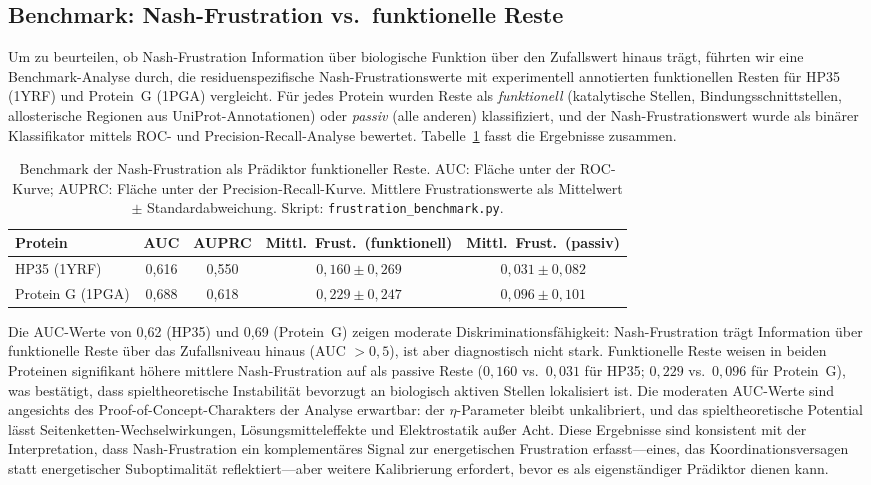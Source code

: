 \documentclass[12pt,a4paper]{article}
\theoremstyle{remark}
\begin{document}
\subsection{Benchmark: Nash-Frustration vs.\ funktionelle Reste}
\label{sec:frustration-benchmark}

Um zu beurteilen, ob Nash-Frustration Information \"uber biologische Funktion \"uber den Zufallswert hinaus tr\"agt, f\"uhrten wir eine Benchmark-Analyse durch, die residuenspezifische Nash-Frustrationswerte mit experimentell annotierten funktionellen Resten f\"ur HP35 (1YRF) und Protein~G (1PGA) vergleicht. F\"ur jedes Protein wurden Reste als \emph{funktionell} (katalytische Stellen, Bindungsschnittstellen, allosterische Regionen aus UniProt-Annotationen) oder \emph{passiv} (alle anderen) klassifiziert, und der Nash-Frustrationswert wurde als bin\"arer Klassifikator mittels ROC- und Precision-Recall-Analyse bewertet. Tabelle~\ref{tab:frustration-benchmark} fasst die Ergebnisse zusammen.

\begin{table}[ht]
\centering
\caption{Benchmark der Nash-Frustration als Pr\"adiktor funktioneller Reste. AUC: Fl\"ache unter der ROC-Kurve; AUPRC: Fl\"ache unter der Precision-Recall-Kurve. Mittlere Frustrationswerte als Mittelwert $\pm$ Standardabweichung. Skript: \texttt{frustration\_benchmark.py}.}
\label{tab:frustration-benchmark}
\begin{tabular}{lcccc}
\toprule
\textbf{Protein} & \textbf{AUC} & \textbf{AUPRC} & \textbf{Mittl.\ Frust.\ (funktionell)} & \textbf{Mittl.\ Frust.\ (passiv)} \\
\midrule
HP35 (1YRF) & 0{,}616 & 0{,}550 & $0{,}160 \pm 0{,}269$ & $0{,}031 \pm 0{,}082$ \\
Protein G (1PGA) & 0{,}688 & 0{,}618 & $0{,}229 \pm 0{,}247$ & $0{,}096 \pm 0{,}101$ \\
\bottomrule
\end{tabular}
\end{table}

Die AUC-Werte von 0{,}62 (HP35) und 0{,}69 (Protein~G) zeigen moderate Diskriminationsf\"ahigkeit: Nash-Frustration tr\"agt Information \"uber funktionelle Reste \"uber das Zufallsniveau hinaus (AUC $> 0{,}5$), ist aber diagnostisch nicht stark. Funktionelle Reste weisen in beiden Proteinen signifikant h\"ohere mittlere Nash-Frustration auf als passive Reste ($0{,}160$ vs.\ $0{,}031$ f\"ur HP35; $0{,}229$ vs.\ $0{,}096$ f\"ur Protein~G), was best\"atigt, dass spieltheoretische Instabilit\"at bevorzugt an biologisch aktiven Stellen lokalisiert ist. Die moderaten AUC-Werte sind angesichts des Proof-of-Concept-Charakters der Analyse erwartbar: der $\eta$-Parameter bleibt unkalibriert, und das spieltheoretische Potential l\"asst Seitenketten-Wechselwirkungen, L\"osungsmitteleffekte und Elektrostatik au\ss{}er Acht. Diese Ergebnisse sind konsistent mit der Interpretation, dass Nash-Frustration ein komplement\"ares Signal zur energetischen Frustration erfasst---eines, das Koordinationsversagen statt energetischer Suboptimalit\"at reflektiert---aber weitere Kalibrierung erfordert, bevor es als eigenst\"andiger Pr\"adiktor dienen kann.
\end{document}
